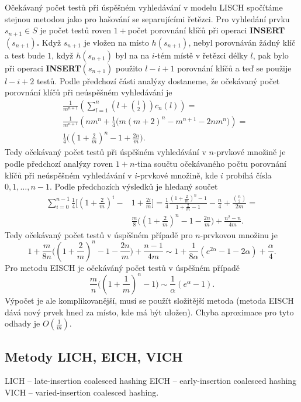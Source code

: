\documentclass[a4paper,12pt]{article}
\begin{document}
Očekávaný počet testů při úspěšném 
vyhledávání v modelu LISCH spočítáme stejnou meto\-dou jako 
pro hašování se separujícími řetězci.  Pro vyhledání prvku 
$s_{n+1}\in S$ je počet testů roven $1+$počet porovnání 
klíčů při operaci {\bf INSERT$(s_{n+1})$.}  Když $
s_{n+1}$ je vložen 
na místo $h(s_{n+1})$, nebyl porovnáván žádný klíč a test bude $
1$, 
když $h(s_{n+1})$ byl na na $i$-tém místě v řetězci délky $
l$, pak bylo 
při operaci {\bf INSERT$(s_{n+1})$} použito $l-i+1$ porovnání klíčů 
a teď se použije $l-i+2$ testů. Podle předchozí části analýzy dostaneme, že očekávaný počet 
porovnání klíčů při neúspěšném vyhledávání je 
\begin{align*}&\frac 1{m^{n+1}}(\sum_{l=1}^n(l+\binom l2)c_n(l))=\\
&\frac 1{m^{n+1}}(nm^n+\frac 14\big(m(m+2)^n-m^{n+1}-2nm^n\big))=\\
&\frac 14\big((1+\frac 2m)^n-1+\frac {2n}m\big).\end{align*}
Tedy očekávaný počet testů při úspěšném 
vy\-hledávání v $n$-prvkové množině je podle 
před\-cho\-zí analýzy 
roven $1+n$-tina součtu očekávaného počtu porovnání 
klíčů při neúspěšném vy\-hledávání v $
i$-prvkové 
množině, kde $i$ probíhá čísla $0,1,\dots,n-1$.  Podle předchozích 
výsledků je hledaný součet 
\begin{align*}\sum_{i=0}^{n-1}\frac 14\big[(1+\frac 2m)^i-&1+\frac {2i}
m\big]=\frac 14\frac {(1+\frac 2m)^n-1}{1+\frac 2m-1}-\frac n4+\frac {\binom 
n2}{2m}=\\
&\frac m8\big((1+\frac 2m)^n-1-\frac {2n}m\big)+\frac {n^2-n}{4m}
.\end{align*}
Tedy očekávaný počet testů v úspěšném 
případě pro $n$-prvko\-vou množinu je 
$$1+\frac m{8n}\big((1+\frac 2m)^n-1-\frac {2n}m\big)+\frac {n-1}{
4m}\sim 1+\frac 1{8\alpha}(e^{2\alpha}-1-2\alpha )+\frac {\alpha}
4.$$
Pro metodu EISCH je očekáváný počet testů v 
úspěšném přípa\-dě 
$$\frac mn\big((1+\frac 1m)^n-1\big)\sim\frac 1{\alpha}(e^{\alpha}
-1).$$
Výpočet je ale komplikovanější, musí se použít složitější metoda (metoda EISCH dává nový prvek hned za místo, kde má být uložen). Chyba aproximace 
pro tyto odhady je $O(\frac 1m)$. 

\subsection{
Metody LICH, EICH, VICH
}

\phantom{---}LICH -- late-insertion coalesced hashing\newline 
\phantom{---}EICH -- early-insertion coalesced hashing\newline 
\phantom{---}VICH -- varied-insertion coalesced hashing.
\end{document}

